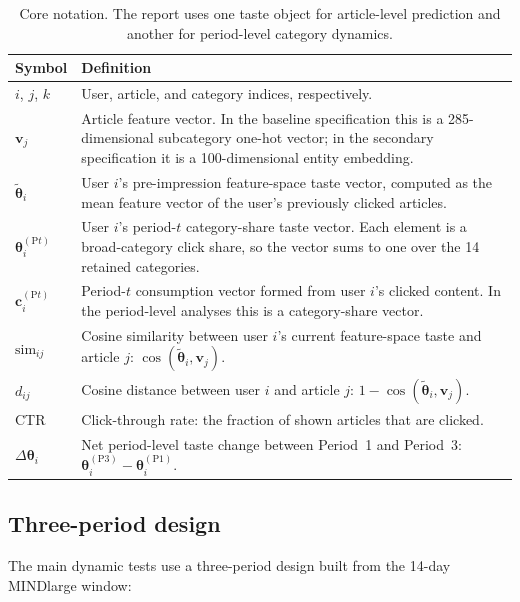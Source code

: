 \documentclass[11pt]{article}
\begin{document}
\begin{table}[ht]
\centering
\caption{Core notation. The report uses one taste object for article-level prediction and another for period-level category dynamics.}
\label{tab:notation}
\begin{tabularx}{\textwidth}{>{\raggedright\arraybackslash}p{}Y}
\toprule
Symbol & Definition \\
\midrule
$i$, $j$, $k$ & User, article, and category indices, respectively. \\
$\mathbf{v}_j$ & Article feature vector. In the baseline specification this is a 285-dimensional subcategory one-hot vector; in the secondary specification it is a 100-dimensional entity embedding. \\
$\tilde{\boldsymbol{\theta}}_i$ & User $i$'s pre-impression feature-space taste vector, computed as the mean feature vector of the user's previously clicked articles. \\
$\boldsymbol{\theta}_i^{(\mathrm{P}t)}$ & User $i$'s period-$t$ category-share taste vector. Each element is a broad-category click share, so the vector sums to one over the 14 retained categories. \\
$\mathbf{c}_i^{(\mathrm{P}t)}$ & Period-$t$ consumption vector formed from user $i$'s clicked content. In the period-level analyses this is a category-share vector. \\
$\text{sim}_{ij}$ & Cosine similarity between user $i$'s current feature-space taste and article $j$: $\cos(\tilde{\boldsymbol{\theta}}_i,\mathbf{v}_j)$. \\
$d_{ij}$ & Cosine distance between user $i$ and article $j$: $1-\cos(\tilde{\boldsymbol{\theta}}_i,\mathbf{v}_j)$. \\
CTR & Click-through rate: the fraction of shown articles that are clicked. \\
$\Delta\boldsymbol{\theta}_i$ & Net period-level taste change between Period~1 and Period~3: $\boldsymbol{\theta}_i^{(\mathrm{P3})} - \boldsymbol{\theta}_i^{(\mathrm{P1})}$. \\
\bottomrule
\end{tabularx}
\end{table}
\FloatBarrier

\subsection{Three-period design}
\label{sec:three_period_design}

The main dynamic tests use a three-period design built from the 14-day MINDlarge window:
\end{document}
